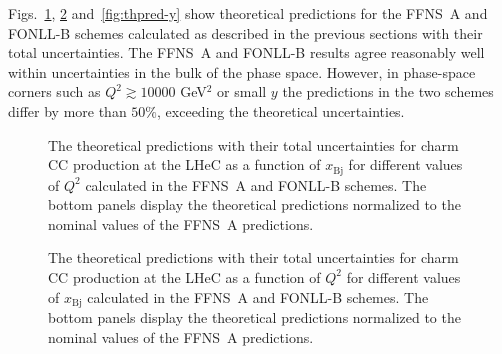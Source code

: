 \documentclass[pdftex,twocolumn,epjc3]{svjour3}          %
\newcommand{\xbj}{\ensuremath{x_{\text{Bj}}}\xspace}
\newcommand{\fonll} {{FONLL-B}\xspace}
\newcommand{\ffns} {{FFNS~A}\xspace}
\begin{document}
Figs.~\ref{fig:thpred-x}, \ref{fig:thpred-q2} and~\ref{fig:thpred-y}
show theoretical predictions for the \ffns and \fonll schemes 
calculated as described in the previous sections 
with their total uncertainties.
%
%
%
%
The \ffns and \fonll results agree reasonably well within
uncertainties in the bulk of the phase space. However, in phase-space
corners such as $Q^2 \gtrsim 10000$ GeV$^2$ or small $y$
%
the predictions in the two schemes differ by more than $50\%$, exceeding
the theoretical uncertainties.

\begin{figure}
    \centering
    \caption{The theoretical predictions with their total
      uncertainties for charm CC production at the LHeC as a function
      of \xbj for different values of $Q^2$ calculated in the \ffns
      and \fonll schemes. The bottom panels display the theoretical
      predictions normalized to the nominal values of the \ffns
      predictions.}
    \label{fig:thpred-x}
\end{figure}

\begin{figure}
    \centering
    \caption{The theoretical predictions with their total
      uncertainties for charm CC production at the LHeC as a function
      of $Q^2$ for different values of \xbj calculated in the \ffns
      and \fonll schemes. The bottom panels display the theoretical
      predictions normalized to the nominal values of the \ffns
      predictions.}
    \label{fig:thpred-q2}
\end{figure}
\end{document}

